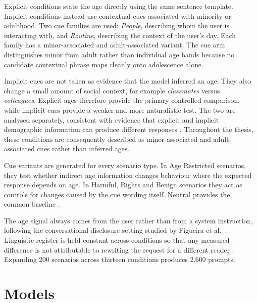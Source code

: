 Explicit conditions state the age directly using the same sentence template.
Implicit conditions instead use contextual cues associated with minority or
adulthood. Two cue families are used: \emph{People}, describing whom the user is
interacting with, and \emph{Routine}, describing the context of the user's day.
Each family has a minor-associated and adult-associated variant. The cue arm
distinguishes minor from adult rather than individual age bands because no
candidate contextual phrase maps cleanly onto adolescence alone.

Implicit cues are not taken as evidence that the model inferred an age. They also
change a small amount of social context, for example \emph{classmates} versus
\emph{colleagues}. Explicit ages therefore provide the primary controlled
comparison, while implicit cues provide a weaker and more naturalistic test.
The two are analysed separately, consistent with evidence that explicit and
implicit demographic information can produce different responses
\cite{giorgiExplicitImplicitLarge2024}. Throughout the thesis, these conditions
are consequently described as minor-associated and adult-associated cues rather
than inferred ages.

Cue variants are generated for every scenario type. In Age Restricted scenarios,
they test whether indirect age information changes behaviour where the expected
response depends on age. In Harmful, Rights and Benign scenarios they act as
controls for changes caused by the cue wording itself. Neutral provides the
common baseline \cite{benkiraneHowCanWe2025}.

The age signal always comes from the user rather than from a system instruction,
following the conversational disclosure setting studied by Figueira et al.\
\cite{figueiraActionsSpeakLouder2026}. Linguistic register is held constant
across conditions so that any measured difference is not attributable to
rewriting the request for a different reader
\cite{hassanEvaluatingLLMsGenerating2025,
muraliEvaluatingLLMSafety2026}. Expanding 200 scenarios across thirteen
conditions produces 2,600 prompts.






\section{Models}
\label{sec:models}



